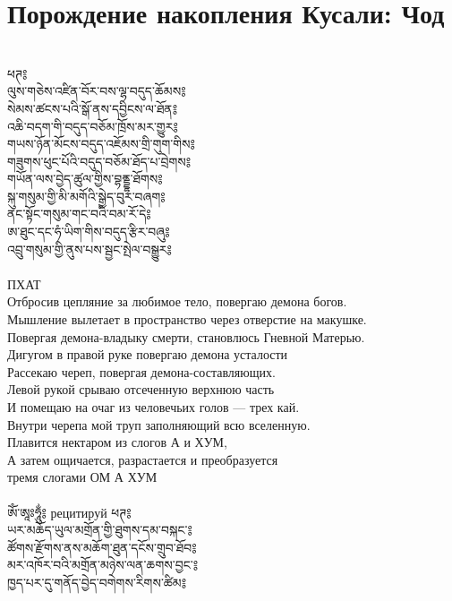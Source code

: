 \ru
\section{Порождение накопления Кусали: Чод}
\\
\ti
ཕཊ༔ \\
ལུས་གཅེས་འཛིན་བོར་བས་ལྷ་བདུད་ཆོམས༔\\
སེམས་ཚངས་པའི་སྒོ་ནས་དབྱིངས་ལ་ཐོན༔\\
འཆི་བདག་གི་བདུད་བཅོམ་ཁྲོས་མར་གྱུར༔\\
གཡས་ཉོན་མོངས་བདུད་འཇོམས་གྲི་གུག་གིས༔\\
གཟུགས་ཕུང་པོའི་བདུད་བཅོམ་ཐོད་པ་བྲེགས༔\\
གཡོན་ལས་བྱེད་ཚུལ་གྱིས་བྷནྡྷ་ཐོགས༔\\
སྐུ་གསུམ་གྱི་མི་མགོའི་སྒྱེད་བུར་བཞག༔\\
ནང་སྟོང་གསུམ་གང་བའི་བམ་རོ་དེ༔\\
ཨ་ཐུང་དང་ཧཾ་ཡིག་གིས་བདུད་རྩིར་བཞུ༔\\
འབྲུ་གསུམ་གྱི་ནུས་པས་སྦྱང་སྤེལ་བསྒྱུར༔\\
\\
\ru
ПХАТ\\
Отбросив цепляние за любимое тело, повергаю демона богов.\\
Мышление вылетает в пространство через отверстие на макушке.\\
Повергая демона-владыку смерти, становлюсь Гневной Матерью.\\
Дигугом в правой руке повергаю демона усталости\\
Рассекаю череп, повергая демона-составляющих.\\
Левой рукой срываю отсеченную верхнюю часть\\
И помещаю на очаг из человечьих голов — трех кай.\\
Внутри черепа мой труп заполняющий всю вселенную.\\
Плавится нектаром из слогов А и ХУМ,\\
А затем ощичается, разрастается и преобразуется\\
тремя слогами ОМ А ХУМ\\
\\
\ti
ཨོཾ་ཨཱཿཧཱུྂ༔
\ru рецитируй
\newpage
\ti
ཕཊ༔\\
ཡར་མཆོད་ཡུལ་མགྲོན་གྱི་ཐུགས་དམ་བསྐང་༔\\
ཚོགས་རྫོགས་ནས་མཆོག་ཐུན་དངོས་གྲུབ་ཐོབ༔\\
མར་འཁོར་བའི་མགྲོན་མཉེས་ལན་ཆགས་བྱང་༔\\
ཁྱད་པར་དུ་གནོད་བྱེད་བགེགས་རིགས་ཚིམ༔\\
